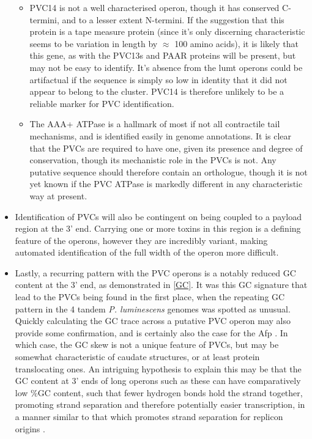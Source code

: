 \begin{itemize}
\begin{itemize}
	\item PVC14 is not a well characterised operon, though it has conserved C-termini, and to a lesser extent N-termini. If the suggestion that this protein is a tape measure protein (since it's only discerning characteristic seems to be variation in length by $\approx$ 100 amino acids), it is likely that this gene, as with the PVC13s and PAAR proteins will be present, but may not be easy to identify. It's absence from the lumt operons could be artifactual if the sequence is simply so low in identity that it did not appear to belong to the cluster. PVC14 is therefore unlikely to be a reliable marker for PVC identification.
	\item The AAA+ ATPase is a hallmark of most if not all contractile tail mechanisms, and is identified easily in genome annotations. It is clear that the PVCs are required to have one, given its presence and degree of conservation, though its mechanistic role in the PVCs is not. Any putative sequence should therefore contain an orthologue, though it is not yet known if the PVC ATPase is markedly different in any characteristic way at present.
	\end{itemize}
\item Identification of PVCs will also be contingent on being coupled to a payload region at the 3' end. Carrying one or more toxins in this region is a defining feature of the operons, however they are incredibly variant, making automated identification of the full width of the operon more difficult.
\item Lastly, a recurring pattern with the PVC operons is a notably reduced GC content at the 3' end, as demonstrated in \vref{GC}. It was this GC signature that lead to the PVCs being found in the first place, when the repeating GC pattern in the 4 tandem \emph{P. luminescens} genomes was spotted as unusual. Quickly calculating the GC trace across a putative PVC operon may also provide some confirmation, and is certainly also the case for the Afp \citep{Hurst2004}. In which case, the GC skew is not a unique feature of PVCs, but may be somewhat characteristic of caudate structures, or at least protein translocating ones. An intriguing hypothesis to explain this may be that the GC content at 3' ends of long operons such as these can have comparatively low \%GC content, such that fewer hydrogen bonds hold the strand together, promoting strand separation and therefore potentially easier transcription, in a manner similar to that which promotes strand separation for replicon origins \citep{Artsimovitch2002}.
\end{itemize}

